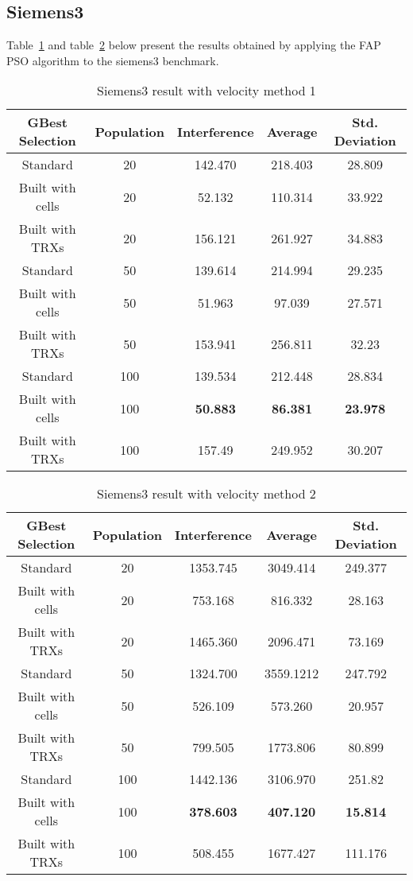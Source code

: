 \subsection{Siemens3}
Table~\ref{tab:siem3m1} and table~\ref{tab:siem3m2} below present the results obtained by applying the FAP PSO algorithm to the siemens3 benchmark.
\begin{table}[H]
\centering
	\begin{tabular}{| c | c | c | c | c |}
	\hline
	GBest Selection & Population & Interference & Average & Std. Deviation\\ \hline
	Standard & 20 & 142.470 & 218.403 & 28.809\\ \hline
	Built with cells & 20 & 52.132 & 110.314 & 33.922\\ \hline
	Built with TRXs & 20 & 156.121 & 261.927 & 34.883\\ \hline
	Standard & 50 & 139.614 & 214.994 & 29.235\\ \hline
	Built with cells & 50 & 51.963 & 97.039 & 27.571\\ \hline
	Built with TRXs & 50 & 153.941 & 256.811 & 32.23\\ \hline
	Standard & 100 & 139.534 & 212.448 & 28.834\\ \hline
	Built with cells & 100 & \textbf{50.883} & \textbf{86.381} & \textbf{23.978}\\ \hline
	Built with TRXs & 100 & 157.49 & 249.952 & 30.207\\ \hline
	\end{tabular}
\caption{Siemens3 result with velocity method 1}
\label{tab:siem3m1}
\end{table}
\begin{table}[H]
\centering
	\begin{tabular}{| c | c | c | c | c |}
	\hline
	GBest Selection & Population & Interference & Average & Std. Deviation\\ \hline
	Standard & 20 & 1353.745 & 3049.414 & 249.377\\ \hline
	Built with cells & 20 & 753.168 & 816.332 & 28.163\\ \hline
	Built with TRXs & 20 & 1465.360 & 2096.471 & 73.169\\ \hline
	Standard & 50 & 1324.700 & 3559.1212 & 247.792\\ \hline
	Built with cells & 50 & 526.109 & 573.260 & 20.957\\ \hline
	Built with TRXs & 50 & 799.505 & 1773.806 & 80.899\\ \hline
	Standard & 100 & 1442.136 & 3106.970 & 251.82\\ \hline
	Built with cells & 100 & \textbf{378.603} & \textbf{407.120} & \textbf{15.814}\\ \hline
	Built with TRXs & 100 & 508.455 & 1677.427 & 111.176\\ \hline
	\end{tabular}
\caption{Siemens3 result with velocity method 2}
\label{tab:siem3m2}
\end{table}
